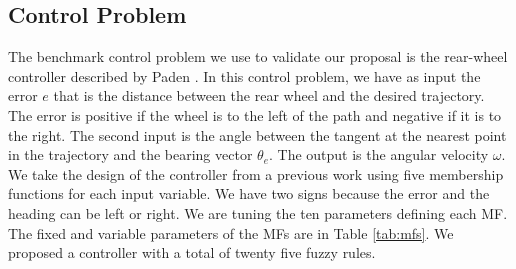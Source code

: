 \documentclass[runningheads]{llncs}
\begin{document}
\subsection{Control Problem}\label{sub:fuzzy}

The benchmark control problem we use to validate our proposal is the rear-wheel
controller described by Paden \cite{paden_survey_2016}. In this control problem, we have as
input the error $e$ that is the distance between the rear wheel and the desired
trajectory. The error is positive if the wheel is to the left of the path and
negative if it is to the right. The second input is the angle between the
tangent at the nearest point in the trajectory and the bearing
vector $\theta_{e}$. The output is the angular velocity $\omega$. We take the
design of the controller from a previous work \cite{mancilla2022tracking} using five membership
functions for each input variable. We have two signs because the error and the
heading can be left or right. We are tuning the ten parameters defining each
MF. The fixed and variable parameters of the MFs are in Table \ref{tab:mfs}. We proposed a
controller with a total of twenty five fuzzy rules.
\end{document}
